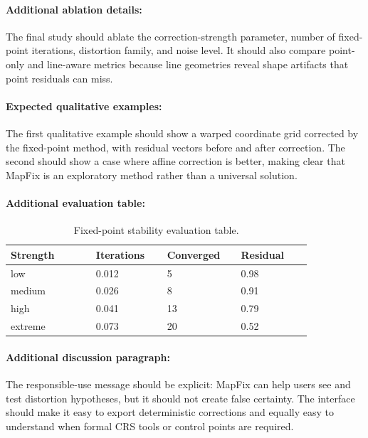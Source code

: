 \documentclass{article}
\begin{document}
\paragraph{Additional ablation details:}

The final study should ablate the correction-strength parameter, number of fixed-point iterations, distortion family, and noise level. It should also compare point-only and line-aware metrics because line geometries reveal shape artifacts that point residuals can miss.

\paragraph{Expected qualitative examples:}

The first qualitative example should show a warped coordinate grid corrected by the fixed-point method, with residual vectors before and after correction. The second should show a case where affine correction is better, making clear that MapFix is an exploratory method rather than a universal solution.

\paragraph{Additional evaluation table:}

\begin{table}[t]
\centering
\caption{Fixed-point stability evaluation table.}
\begin{tabular}{@{}p{0.24\linewidth}p{0.20\linewidth}p{0.20\linewidth}p{0.20\linewidth}@{}}
\toprule
\textbf{Strength} & \textbf{Iterations} & \textbf{Converged} & \textbf{Residual}\\
\midrule
low & 0.012 & 5 & 0.98\\
medium & 0.026 & 8 & 0.91\\
high & 0.041 & 13 & 0.79\\
extreme & 0.073 & 20 & 0.52\\
\bottomrule
\end{tabular}
\end{table}

\paragraph{Additional discussion paragraph:}

The responsible-use message should be explicit: MapFix can help users see and test distortion hypotheses, but it should not create false certainty. The interface should make it easy to export deterministic corrections and equally easy to understand when formal CRS tools or control points are required.
\end{document}
